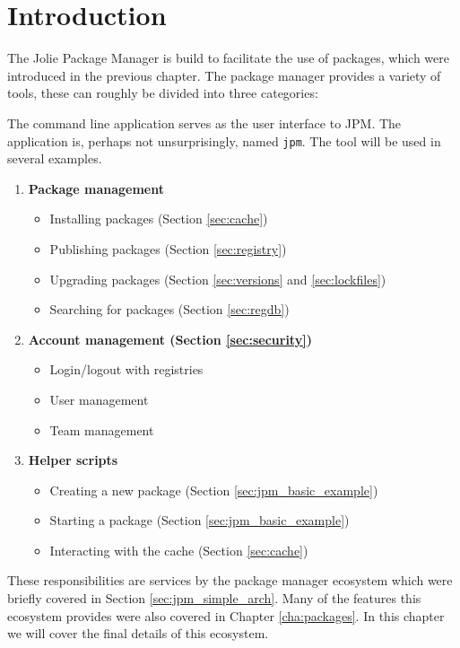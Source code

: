\section{Introduction}

The Jolie Package Manager is build to facilitate the use of packages, which
were introduced in the previous chapter. The package manager provides a variety
of tools, these can roughly be divided into three categories:

The command line application serves as the user interface to JPM. The
application is, perhaps not unsurprisingly, named \texttt{jpm}. The
tool will be used in several examples.

\begin{enumerate}
\item \textbf{Package management}
    \begin{itemize}
        \item Installing packages (Section \ref{sec:cache})
        \item Publishing packages (Section \ref{sec:registry})
        \item Upgrading packages (Section \ref{sec:versions} and
                \ref{sec:lockfiles})
        \item Searching for packages (Section \ref{sec:regdb})
    \end{itemize}
\item \textbf{Account management (Section \ref{sec:security})}
    \begin{itemize}
        \item Login/logout with registries
        \item User management
        \item Team management
    \end{itemize}
\item \textbf{Helper scripts}
    \begin{itemize}
        \item Creating a new package (Section \ref{sec:jpm_basic_example})
        \item Starting a package (Section \ref{sec:jpm_basic_example})
        \item Interacting with the cache (Section \ref{sec:cache})
    \end{itemize}
\end{enumerate}

These responsibilities are services by the package manager ecosystem which were
briefly covered in Section \ref{sec:jpm_simple_arch}. Many of the features this
ecosystem provides were also covered in Chapter \ref{cha:packages}. In this
chapter we will cover the final details of this ecosystem.

